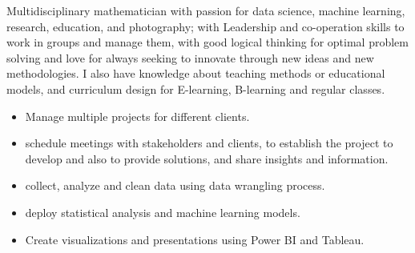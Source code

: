 \documentclass[10pt,a4paper,ragged2e,withhyper]{altacv}
\begin{document}
Multidisciplinary mathematician with passion for data science, machine
learning, research, education, and photography; with
Leadership and co-operation skills to work in groups and manage them, with good logical thinking for optimal
problem solving and love for always seeking to innovate through new ideas and
new methodologies.
I also have knowledge about teaching methods or educational models, and curriculum design for E-learning, B-learning and regular classes. 
\begin{paracol}{2}

\begin{itemize}
    \item Manage multiple projects for different clients.
    \item schedule meetings with stakeholders and clients, to establish the project to develop and also to provide solutions, and share insights and information.
    \item collect, analyze and clean data using data wrangling process.
    \item deploy statistical analysis and machine learning models.
    \item Create visualizations and presentations using Power BI and Tableau.
\end{itemize}
\vspace{0.2cm}


\end{paracol}
\end{document}
